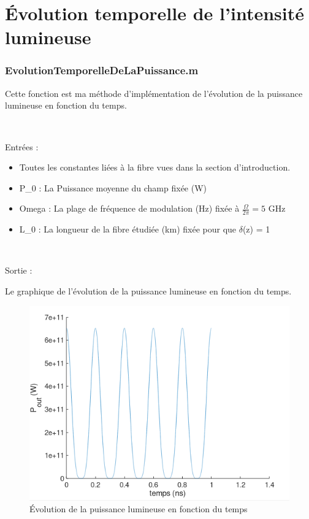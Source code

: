 \documentclass[a4paper,12pt,titlepage]{article}
\begin{document}
    \newpage
    
    \section{Évolution temporelle de l'intensité lumineuse}
        
        \subsubsection*{EvolutionTemporelleDeLaPuissance.m}
             Cette fonction est ma méthode d'implémentation de l'évolution de la puissance lumineuse en fonction du temps.
             
             ~
             
             Entrées :
             \begin{itemize}
                 \item Toutes les constantes liées à la fibre vues dans la section d'introduction.
                 \item P\_0 : La Puissance moyenne du champ fixée (W)
                 \item Omega : La plage de fréquence de modulation (Hz) fixée à $\frac{\Omega}{2\pi} = 5 $ GHz
                 \item L\_0 : La longueur de la fibre étudiée (km) fixée pour que $\delta$(z) = 1 
                 
             \end{itemize}
             
             ~
             
             Sortie :
             
            Le graphique de l'évolution de la puissance lumineuse en fonction du temps.
    
        \begin{figure}[h!]
            \centering
            \includegraphics{P_out(t).PNG}
            \caption{Évolution de la puissance lumineuse en fonction du temps}
            \label{delta}
        \end{figure}
        
\end{document}
